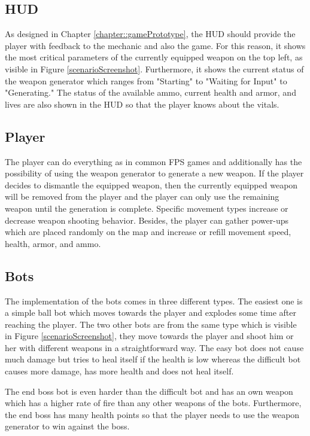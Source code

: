\documentclass[MGS,Master,english]{twbook}%
\begin{document}
\subsection{\acl{HUD}}
As designed in Chapter \ref{chapter::gamePrototype}, the \ac{HUD} should provide the player with feedback to the mechanic and also the game. For this reason, it shows the most critical parameters of the currently equipped weapon on the top left, as visible in Figure \ref{scenarioScreenshot}. Furthermore, it shows the current status of the weapon generator which ranges from "Starting" to "Waiting for Input" to "Generating." The status of the available ammo, current health and armor, and lives are also shown in the \ac{HUD} so that the player knows about the vitals.

\subsection{Player}
The player can do everything as in common \ac{FPS} games and additionally has the possibility of using the weapon generator to generate a new weapon. If the player decides to dismantle the equipped weapon, then the currently equipped weapon will be removed from the player and the player can only use the remaining weapon until the generation is complete. Specific movement types increase or decrease weapon shooting behavior. Besides, the player can gather power-ups which are placed randomly on the map and increase or refill movement speed, health, armor, and ammo.

\subsection{Bots}
The implementation of the bots comes in three different types. The easiest one is a simple ball bot which moves towards the player and explodes some time after reaching the player. The two other bots are from the same type  which is visible in Figure \ref{scenarioScreenshot}, they move towards the player and shoot him or her with different weapons in a straightforward way. The easy bot does not cause much damage but tries to heal itself if the health is low whereas the difficult bot causes more damage, has more health and does not heal itself.

The end boss bot is even harder than the difficult bot and has an own weapon which has a higher rate of fire than any other weapons of the bots. Furthermore, the end boss has many health points so that the player needs to use the weapon generator to win against the boss.
\end{document}
